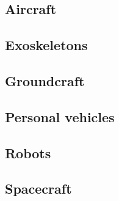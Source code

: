 \subsection{Aircraft}
\label{sec:aircraft}

\subsection{Exoskeletons}
\label{sec:exoskeletons}

\subsection{Groundcraft}
\label{sec:groundcraft}

\subsection{Personal vehicles}
\label{sec:personal-vehicles}

\subsection{Robots}
\label{sec:robots}

\subsection{Spacecraft}
\label{sec:spacecraft}

